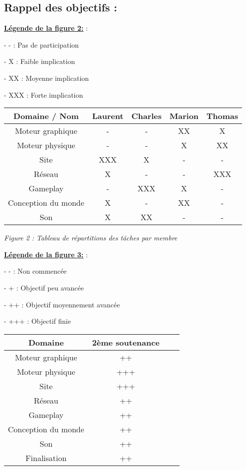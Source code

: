 \documentclass{article}
\begin{document}
\quad

	\subsection{Rappel des objectifs :}

\quad

\underline{\textbf{Légende de la figure 2:}} : 

\quad
	   -  -     : Pas de participation

 \quad
	- X     : Faible implication

 \quad
	- XX   : Moyenne implication

 \quad
	- XXX : Forte implication 

\quad

\quad 

\begin{tabular}{|c||c|c|c|c|}
\hline Domaine / Nom & Laurent & Charles & Marion & Thomas \\ 
\hline Moteur graphique & - & - & XX & X\\
\hline Moteur physique & - & - & X & XX\\
\hline Site & XXX & X & - & -\\
\hline Réseau & X & - & - & XXX\\
\hline Gameplay & - & XXX & X & -\\
\hline Conception du monde & X & - & XX & -\\
\hline Son & X & XX & - & -\\
\hline
\end {tabular}

\quad

\begin{center}

\textit{Figure 2 : Tableau de répartitions des tâches par membre}

\end{center}

\quad

\underline{\textbf{Légende de la figure 3:}} : 

\quad
	   -  -     : Non commencée

 \quad
	- +     : Objectif peu avancée

 \quad
	- ++   : Objectif moyennement avancée

 \quad
	- +++ : Objectif finie 

\quad

			\begin{tabular}{|c|c|c|c|}
\hline Domaine  & 2ème soutenance \\
\hline Moteur graphique & ++\\
\hline Moteur physique & +++\\
\hline Site & +++ \\
\hline Réseau & ++ \\
\hline Gameplay & ++\\
\hline Conception du monde & ++\\
\hline Son & ++\\
\hline Finalisation &++\\
\hline
			\end {tabular}
\end{document}
